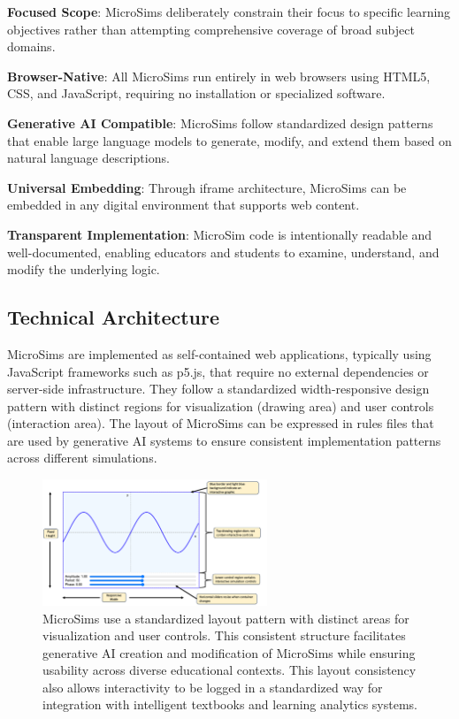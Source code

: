\textbf{Focused Scope}: MicroSims deliberately constrain their focus to specific learning objectives rather than attempting comprehensive coverage of broad subject domains.

\textbf{Browser-Native}: All MicroSims run entirely in web browsers using HTML5, CSS, and JavaScript, requiring no installation or specialized software.

\textbf{Generative AI Compatible}: MicroSims follow standardized design patterns that enable large language models to generate, modify, and extend them based on natural language descriptions.

\textbf{Universal Embedding}: Through iframe architecture, MicroSims can be embedded in any digital environment that supports web content.

\textbf{Transparent Implementation}: MicroSim code is intentionally readable and well-documented, enabling educators and students to examine, understand, and modify the underlying logic.

\subsection{Technical Architecture}

MicroSims are implemented as self-contained web applications, typically using JavaScript frameworks such as p5.js, that require no external dependencies or server-side infrastructure. They follow a standardized width-responsive design pattern with distinct regions for visualization (drawing area) and user controls (interaction area). The layout of MicroSims can be expressed in rules files that are used by generative AI systems to ensure consistent implementation patterns across different simulations.

\begin{figure}[htbp]
\centering
\includegraphics[width=0.6\textwidth]{figures/microsim-layout.png}
\caption{MicroSims use a standardized layout pattern with distinct areas for visualization and user controls. This consistent structure facilitates generative AI creation and modification of MicroSims while ensuring usability across diverse educational contexts.  This layout consistency also allows interactivity to be logged in a standardized way for integration with intelligent textbooks and learning analytics systems.}
\label{fig:layout}
\end{figure}



